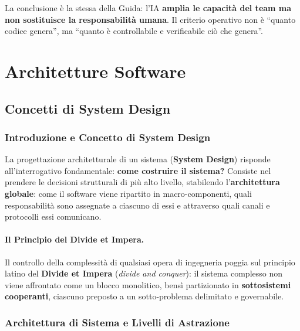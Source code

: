 \documentclass[12pt]{extarticle}
\begin{document}
\noindent La conclusione è la stessa della Guida: l'IA \textbf{amplia le capacità del team ma non sostituisce la responsabilità umana}. Il criterio operativo non è ``quanto codice genera'', ma ``quanto è controllabile e verificabile ciò che genera''.


\newpage

\section{Architetture Software}

\subsection{Concetti di System Design}
\subsubsection{Introduzione e Concetto di System Design}

\noindent La progettazione architetturale di un sistema (\textbf{System Design}) risponde all'interrogativo fondamentale: \textbf{come costruire il sistema?}
Consiste nel prendere le decisioni strutturali di più alto livello, stabilendo l'\textbf{architettura globale}: come il software viene ripartito in macro-componenti, quali responsabilità sono assegnate a ciascuno di essi e attraverso quali canali e protocolli essi comunicano.

\paragraph{Il Principio del Divide et Impera.}
Il controllo della complessità di qualsiasi opera di ingegneria poggia sul principio latino del \textbf{Divide et Impera} (\textit{divide and conquer}): il sistema complesso non viene affrontato come un blocco monolitico, bensì partizionato in \textbf{sottosistemi cooperanti}, ciascuno preposto a un sotto-problema delimitato e governabile.

\subsubsection{Architettura di Sistema e Livelli di Astrazione}
\end{document}
